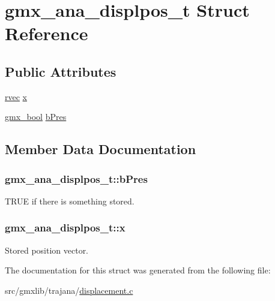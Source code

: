 \hypertarget{structgmx__ana__displpos__t}{\section{gmx\-\_\-ana\-\_\-displpos\-\_\-t \-Struct \-Reference}
\label{structgmx__ana__displpos__t}
}
\subsection*{\-Public \-Attributes}
\begin{DoxyCompactItemize}
\item 
\hyperlink{share_2template_2gromacs_2types_2simple_8h_aa02a552a4abd2f180c282a083dc3a999}{rvec} \hyperlink{structgmx__ana__displpos__t_a4f9e59ef9906b2a3d1fae929aa31b369}{x}
\item 
\hyperlink{include_2types_2simple_8h_a8fddad319f226e856400d190198d5151}{gmx\-\_\-bool} \hyperlink{structgmx__ana__displpos__t_a33feb82572112e07d33c32195a0f2dc3}{b\-Pres}
\end{DoxyCompactItemize}


\subsection{\-Member \-Data \-Documentation}
\hypertarget{structgmx__ana__displpos__t_a33feb82572112e07d33c32195a0f2dc3}{
\subsubsection[{b\-Pres}]{ {\bf gmx\-\_\-ana\-\_\-displpos\-\_\-t\-::b\-Pres}}}\label{structgmx__ana__displpos__t_a33feb82572112e07d33c32195a0f2dc3}
\-T\-R\-U\-E if there is something stored. \hypertarget{structgmx__ana__displpos__t_a4f9e59ef9906b2a3d1fae929aa31b369}{
\subsubsection[{x}]{ {\bf gmx\-\_\-ana\-\_\-displpos\-\_\-t\-::x}}}\label{structgmx__ana__displpos__t_a4f9e59ef9906b2a3d1fae929aa31b369}
\-Stored position vector. 

\-The documentation for this struct was generated from the following file\-:\begin{DoxyCompactItemize}
\item 
src/gmxlib/trajana/\hyperlink{displacement_8c}{displacement.\-c}\end{DoxyCompactItemize}
